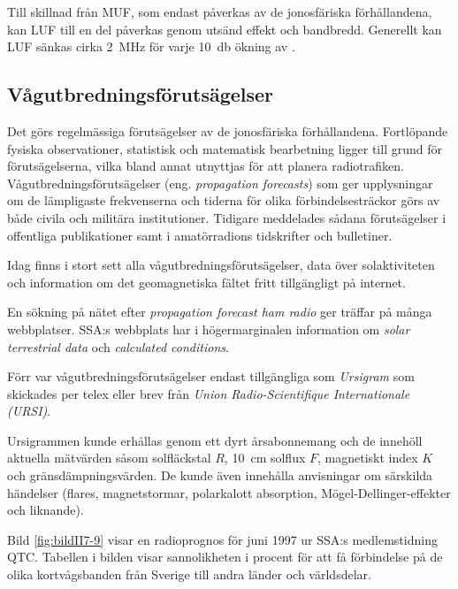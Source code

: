Till skillnad från MUF, som endast påverkas av de jonosfäriska
förhållandena, kan LUF till en del påverkas genom utsänd effekt och bandbredd.
Generellt kan LUF sänkas cirka \SI{2}{\mega\hertz} för varje
\SI{10}{\decibel} ökning av \erp.

\subsection{Vågutbredningsförutsägelser}

Det görs regelmässiga förutsägelser av de jonosfäriska förhållandena.
Fortlöpande fysiska observationer, statistisk och matematisk bearbetning ligger
till grund för förutsägelserna, vilka bland annat utnyttjas för att planera
radiotrafiken.
Vågutbredningsförutsägelser (eng. \emph{propagation forecasts}) som ger
upplysningar om de lämpligaste frekvenserna och tiderna för olika
förbindelsesträckor görs av både civila och militära institutioner.
Tidigare meddelades sådana förutsägelser i offentliga publikationer samt i
amatörradions tidskrifter och bulletiner.

Idag finns i stort sett alla vågutbredningsförutsägelser, data över
solaktiviteten och information om det geomagnetiska fältet fritt tillgängligt på
internet.

En sökning på nätet efter \emph{propagation forecast ham radio} ger träffar på
många webbplatser.
SSA:s webbplats har i högermarginalen information om \emph{solar terrestrial data}
och \emph{calculated conditions}.

Förr var vågutbredningsförutsägelser endast tillgängliga som \emph{Ursigram} som
skickades per telex eller brev från \emph{Union Radio-Scientifique
Internationale (URSI)}.

Ursigrammen kunde erhållas genom ett dyrt årsabonnemang och de innehöll aktuella
mätvärden såsom solfläckstal \(R\), \SI{10}{\centi\metre} solflux \(F\),
magnetiskt index \(K\) och gränsdämpningsvärden.
De kunde även innehålla anvisningar om särskilda händelser (flares,
magnetstormar, polarkalott absorption, Mögel-Dellinger-effekter och liknande).

Bild \ref{fig:bildII7-9} visar en radioprognos för juni 1997 ur SSA:s
medlemstidning QTC.
Tabellen i bilden visar sannolikheten i procent för att få förbindelse på de
olika kortvågsbanden från Sverige till andra länder och världsdelar.

